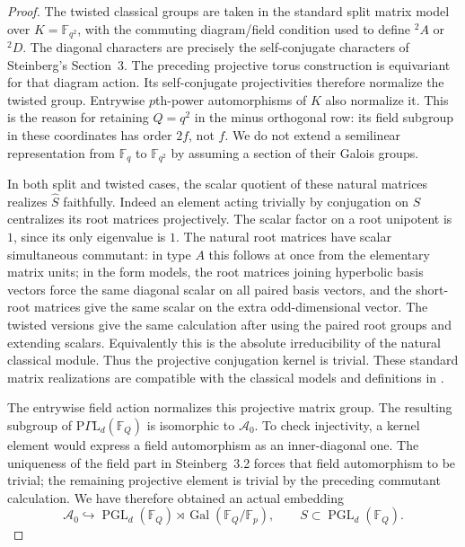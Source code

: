 \begin{proof}
The twisted classical groups are taken in the standard
split matrix model over $K=\mathbb F_{q^2}$, with the
commuting diagram/field condition used to define
${}^2A$ or ${}^2D$. The diagonal characters are precisely
the self-conjugate characters of Steinberg's Section~3.
The preceding projective torus construction is equivariant
for that diagram action. Its self-conjugate projectivities
therefore normalize the twisted group. Entrywise
$p$th-power automorphisms of $K$ also normalize it.
This is the reason for retaining $Q=q^2$ in the minus
orthogonal row: its field subgroup in these coordinates
has order $2f$, not $f$. We do not extend a semilinear
representation from $\mathbb F_q$ to $\mathbb F_{q^2}$
by assuming a section of their Galois groups.

In both split and twisted cases, the scalar quotient of
these natural matrices realizes $\widehat S$ faithfully.
Indeed an element acting trivially by conjugation on
$S$ centralizes its root matrices projectively. The
scalar factor on a root unipotent is $1$, since its
only eigenvalue is $1$. The natural root matrices have
scalar simultaneous commutant: in type $A$ this follows
at once from the elementary matrix units; in the form
models, the root matrices joining hyperbolic basis
vectors force the same diagonal scalar on all paired
basis vectors, and the short-root matrices give the
same scalar on the extra odd-dimensional vector.
The twisted versions give the same calculation after
using the paired root groups and extending scalars.
Equivalently this is the absolute irreducibility of the
natural classical module. Thus the projective conjugation
kernel is trivial. These standard matrix realizations
are compatible with the classical models and definitions
in \citet[Chapters~7--11]{Taylor1992ClassicalB}.

The entrywise field action normalizes this projective
matrix group. The resulting subgroup of
$\mathrm{P}\Gamma\mathrm{L}_d(\mathbb F_Q)$ is isomorphic
to $\mathcal A_0$. To check injectivity, a kernel element
would express a field automorphism as an inner-diagonal
one. The uniqueness of the field part in Steinberg~3.2
forces that field automorphism to be trivial; the
remaining projective element is trivial by the preceding
commutant calculation. We have therefore obtained an
actual embedding
\[
 \mathcal A_0\hookrightarrow
       \operatorname{PGL}_d(\mathbb F_Q)
                    \rtimes\operatorname{Gal}(\mathbb F_Q/\mathbb F_p),
 \qquad S\subset\operatorname{PGL}_d(\mathbb F_Q).
                                                        \tag{D.CA.7}
\]


\end{proof}
